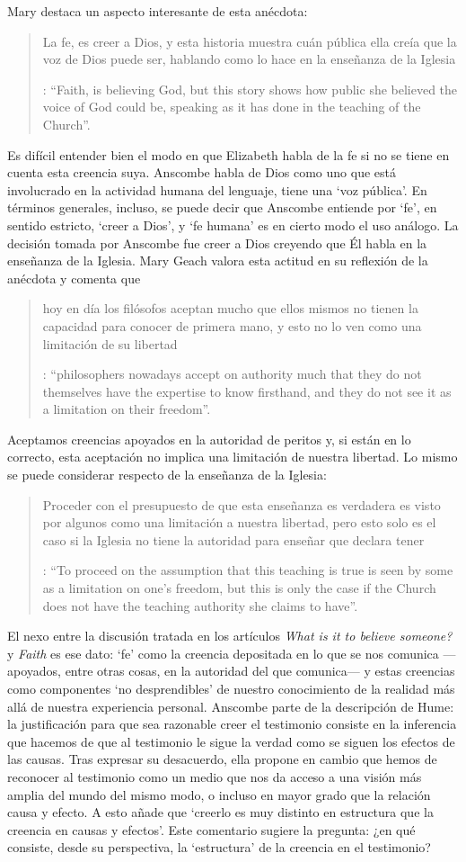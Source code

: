 Mary destaca un aspecto interesante de esta anécdota: \blockquote[{\Cite[Introduction, xvi-xvii]{anscombe2008faith}}: \enquote{Faith, \textelp{} is believing God, but this story shows how public she believed the voice of God could be, speaking as it has done in the teaching of the Church}.]{La fe, \textelp{} es creer a Dios, y esta historia muestra cuán pública ella creía que la voz de Dios puede ser, hablando como lo hace en la enseñanza de la Iglesia}. Es difícil entender bien el modo en que Elizabeth habla de la fe si no se tiene en cuenta esta creencia suya. Anscombe habla de Dios como uno que está involucrado en la actividad humana del lenguaje, tiene una `voz pública'. En términos generales, incluso, se puede decir que Anscombe entiende por `fe', en sentido estricto, `creer a Dios', y `fe humana' es en cierto modo el uso análogo. La decisión tomada por Anscombe fue creer a Dios creyendo que Él habla en la enseñanza de la Iglesia. Mary Geach valora esta actitud en su reflexión de la anécdota y comenta que \blockquote[{\Cite[Introduction, xvii]{anscombe2008faith}}: \enquote{philosophers nowadays accept on authority much that they do not themselves have the expertise to know firsthand, and they do not see it as a limitation on their freedom}.]{hoy en día los filósofos aceptan mucho que ellos mismos no tienen la capacidad para conocer de primera mano, y esto no lo ven como una limitación de su libertad}. Aceptamos creencias apoyados en la autoridad de peritos y, si están en lo correcto, esta aceptación no implica una limitación de nuestra libertad. Lo mismo se puede considerar respecto de la enseñanza de la Iglesia: \blockquote[{\Cite[Introduction, xvi-xvii]{anscombe2008faith}}: \enquote{To proceed on the assumption that this teaching is true is seen by some as a limitation on one's freedom, but this is only the case if the Church does not have the teaching authority she claims to have}.]{Proceder con el presupuesto de que esta enseñanza es verdadera es visto por algunos como una limitación a nuestra libertad, pero esto solo es el caso si la Iglesia no tiene la autoridad para enseñar que declara tener}.

El nexo entre la discusión tratada en los artículos \emph{What is it to believe someone?} y \emph{Faith} es ese dato: `fe' como la creencia depositada en lo que se nos comunica ---apoyados, entre otras cosas, en la autoridad del que comunica--- y estas creencias como componentes `no desprendibles' de nuestro conocimiento de la realidad más allá de nuestra experiencia personal. Anscombe parte de la descripción de Hume: la justificación para que sea razonable creer el testimonio consiste en la inferencia que hacemos de que al testimonio le sigue la verdad como se siguen los efectos de las causas. Tras expresar su desacuerdo, ella propone en cambio que hemos de reconocer al testimonio como un medio que nos da acceso a una visión más amplia del mundo del mismo modo, o incluso en mayor grado que la relación causa y efecto. A esto añade que \enquote*{creerlo es muy distinto en estructura que la creencia en causas y efectos}. Este comentario sugiere la pregunta: ¿en qué consiste, desde su perspectiva, la `estructura' de la creencia en el testimonio?

